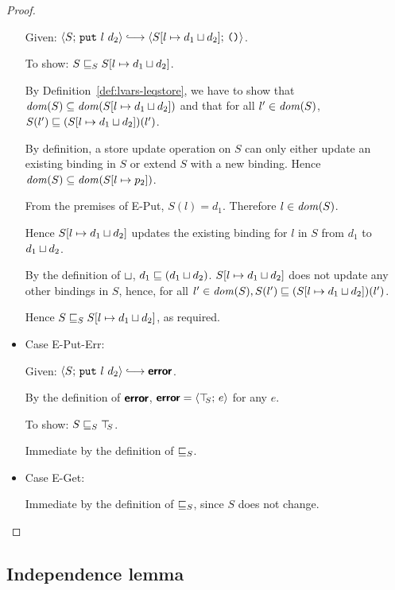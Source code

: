 \begin{proof}
\begin{itemize}
      Given: $\config{S}{\putexp{l}{d_2}} \parstepsto
      \config{\extSRaw{S}{l}{\userlub{d_1}{d_2}}}{\unit}$.

      To show: $S \sqsubseteq_S S[l \mapsto d_1 \sqcup d_2]$.

      By Definition~\ref{def:lvars-leqstore}, we have to show that
      $\mathit{dom}(S) \subseteq \mathit{dom}(S[l \mapsto d_1 \sqcup d_2])$ and
      that for all $l' \in \mathit{dom}(S)$, $S(l') \sqsubseteq
      (S[l \mapsto d_1 \sqcup d_2])(l')$.

      By definition, a store update operation on $S$ can only either
      update an existing binding in $S$ or extend $S$ with a new
      binding.  Hence $\mathit{dom}(S) \subseteq \mathit{dom}(S[l \mapsto p_2])$.

      From the premises of {\sc E-Put}, $S(l) = d_1$.  Therefore $l
      \in \mathit{dom}(S)$.

      Hence $S[l \mapsto d_1 \sqcup d_2]$ updates the existing
      binding for $l$ in $S$ from $d_1$ to $d_1 \sqcup d_2$.

      By the definition of $ \sqcup $, $d_1 \sqsubseteq
      (d_1 \sqcup d_2)$.  $S[l \mapsto d_1 \sqcup d_2]$
      does not update any other bindings in $S$, hence, for all $l'
      \in \mathit{dom}(S), S(l') \sqsubseteq
      (S[l \mapsto d_1 \sqcup d_2])(l')$.

      Hence $S \sqsubseteq_S S[l \mapsto d_1 \sqcup d_2]$, as
      required.

    \item Case {\sc E-Put-Err}:

      Given: $\config{S}{\putexp{l}{d_2}} \parstepsto \error$.

      By the definition of $\textbf{\textsf{error}}$, $\textbf{\textsf{error}} = \langle \top\hspace{-0.85mm}_{S};\, e \rangle$ for
      any $e$.

      To show: $S \sqsubseteq_S \top\hspace{-0.85mm}_{S}$.

      Immediate by the definition of $ \sqsubseteq_S $.

    \item Case {\sc E-Get}:

      Immediate by the definition of $ \sqsubseteq_S $, since $S$ does
      not change.

  \end{itemize}

\end{proof}

\subsection{Independence lemma}

